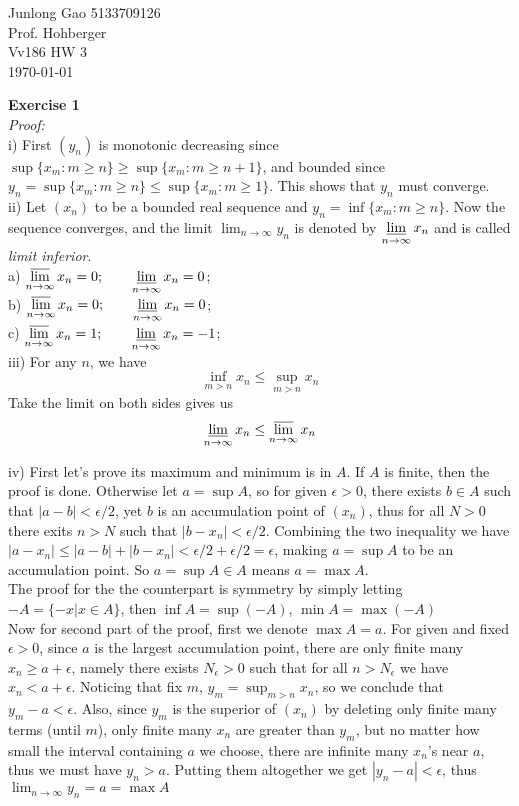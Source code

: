 \documentclass[12pt]{article}
\begin{document}
 
\begin{flushleft}
  Junlong Gao 5133709126\\ 
  Prof.  Hohberger\\ 
  Vv186 HW 3\\
  \today 
\end{flushleft}


\textbf{Exercise 1}\\ 
\textit{Proof:}\\
i) First $(y_n)$ is monotonic decreasing since 
$\sup\{x_m:m\ge n\}\ge\sup\{x_m:m\ge n+1\}$, 
and bounded since
$y_n=\sup\{x_m:m\ge n\}\leq \sup\{x_m:m\ge 1\}$.
This shows that ${y_n}$ must converge.\\

ii) Let $(x_n)$ to be a bounded real sequence and
$y_n=\inf\{x_m:m\ge n\} $. 
Now the sequence converges, and the limit
$\displaystyle\lim_{n\to\infty}y_n$ 
is denoted by
$\displaystyle\varliminf_{n \to \infty}x_n$
and is called \textit{limit inferior}.\\
a)
$\displaystyle\varlimsup_{n\to\infty}x_n=0;\qquad
\varliminf_{n \to \infty}x_n=0$;\\
b)
$\displaystyle\varlimsup_{n\to\infty}x_n=0;\qquad
\varliminf_{n \to \infty}x_n=0$;\\
c)
$\displaystyle\varlimsup_{n\to\infty}x_n=1;\qquad
\varliminf_{n \to \infty}x_n=-1$;\\

iii) For any $n$, we have $$\inf_{m>n} x_n\le\sup_{m>n} x_n$$Take the limit on both
sides gives us $$\varliminf_{n\to\infty}x_n\le\varlimsup_{n\to\infty}x_n$$

iv) First let's prove its maximum and minimum is in $A$. If $A$ is finite, then the proof is done. Otherwise let $a=\sup{A}$, so for given $\epsilon>0$, there exists $b\in A$ such that $|a-b|<\epsilon/2$, yet $b$ is an accumulation point of $(x_n)$, thus for all $N>0$ there exits $n>N$ such that  $|b-x_n|<\epsilon/2$. Combining the two inequality we have $|a-x_n|\leq|a-b|+|b-x_n|<\epsilon/2+\epsilon/2=\epsilon$, making $a=\sup{A}$ to be an accumulation point. So $a=\sup{A}\in A$ means $a=\max{A}$.\\
The proof for the the counterpart is symmetry by simply letting $-A=\{-x|x\in A\}$, then $\inf A=\sup (-A)$, $\min{A}=\max{(-A)}$ \\%

Now for second part of the proof, first we denote $\max{A}=a$. For given and fixed $\epsilon>0$, since $a$ is the largest accumulation point, there are only finite many $x_n\ge a+\epsilon$, namely there exists $N_{\epsilon}>0$ such that for all $n>N_{\epsilon}$ we have $x_n<a+\epsilon$. Noticing that fix $m$, $\displaystyle y_m=\sup_{m>n}x_n$, so we conclude that $y_m-a<\epsilon$. Also, since $y_m$ is the superior of $(x_n)$ by deleting only finite many terms (until $m$), only finite many $x_n$ are greater than $y_m$, but no matter how small the interval containing $a$ we choose, there are infinite many $x_n$'s near $a$,  thus we must have $y_n>a$. Putting them altogether we get $|y_n-a|<\epsilon$, thus $\displaystyle\lim_{n\to\infty}y_n=a=\max{A}$\\
\end{document}
